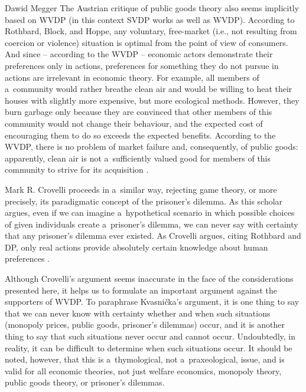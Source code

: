 \begin{artengenv}{Dawid Megger}
The Austrian critique of public goods theory also seems implicitly based on WVDP (in this context SVDP works as well as WVDP). According to Rothbard, Block, and Hoppe, any voluntary, free-market (i.e., not resulting from coercion or violence) situation is optimal from the point of view of consumers. And since -- according to the WVDP -- economic actors demonstrate their preferences only in actions, preferences for something they do not pursue in actions are irrelevant in economic theory. For example, all members of a~community would rather breathe clean air and would be willing to heat their houses with slightly more expensive, but more ecological methods. However, they burn garbage only because they are convinced that other members of this community would not change their behaviour, and the expected cost of encouraging them to do so exceeds the expected benefits. According to the WVDP, there is no problem of market failure and, consequently, of public goods: apparently, clean air is not a~sufficiently valued good for members of this community to strive for its acquisition 
\parencites[][]{block_public_1983}[][]{hoppe_theory_1989}[][]{hoppe_economics_2006}[][]{wisniewski_economics_2018}.%




Mark R. Crovelli proceeds in a~similar way, rejecting game theory, or more precisely, its paradigmatic concept of the prisoner's dilemma. As this scholar argues, even if we can imagine a~hypothetical scenario in which possible choices of given individuals create a~prisoner's dilemma, we can never say with certainty that any prisoner's dilemma ever existed. As Crovelli argues, citing Rothbard and DP, only real actions provide absolutely certain knowledge about human preferences 
\parencite[][]{crovelli_trouble_2006}.%




Although Crovelli's argument seems inaccurate in the face of the considerations presented here, it helps us to formulate an important argument against the supporters of WVDP. To paraphrase Kvasnička's argument, it is one thing to say that we can never know with certainty whether and when such situations (monopoly prices, public goods, prisoner's dilemmas) occur, and it is another thing to say that such situations never occur and cannot occur. Undoubtedly, in reality, it can be difficult to determine when such situations occur. It should be noted, however, that this is a~thymological, not a~praxeological, issue, and is valid for all economic theories, not just welfare economics, monopoly theory, public goods theory, or prisoner's dilemmas.




\end{artengenv}
